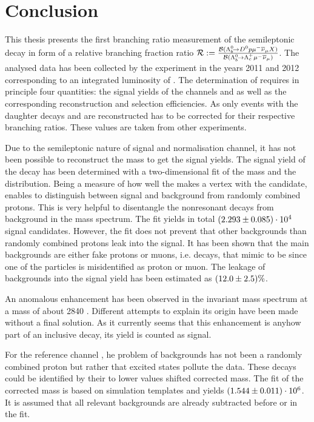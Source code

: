 \chapter{Conclusion}
\label{sec:Conclusion}
This thesis presents the first branching ratio measurement of the semileptonic decay \LbToDpmunuX in form of a relative branching fraction ratio $\mathcal{R} := \frac{{\cal B}({{\Lambda}^0_{b}}\!\rightarrow {\ensuremath{{D}^0}}{\ensuremath{p}}{\ensuremath{\mu^-}}{\ensuremath{{\overline{\nu}}_\mu}} X)}{{\cal B}({{\Lambda}^0_{b}}\!\rightarrow {\ensuremath{{\Lambda}^+_{c}}}{\ensuremath{\mu^-}}{\ensuremath{{\overline{\nu}}_\mu}})}$.
The analysed data has been collected by the \lhcb experiment in the years 2011 and 2012 corresponding to an integrated luminosity of \intlum{3\invfb}.
The determination of \R requires in principle four quantities: the signal yields of the channels \LbToDpmunuX and \LbToLcmunu as well as the corresponding reconstruction and selection efficiencies.
As only events with the daughter decays \DToKpi and \LcTopKpi are reconstructed \R has to be corrected for their respective branching ratios.
These values are taken from other experiments.

Due to the semileptonic nature of signal and normalisation channel, it has not been possible to reconstruct the \Lb mass to get the signal yields.
The signal yield of the decay \LbToDpmunuX has been determined with a two-dimensional fit of the \Dz\proton mass and the \logIP distribution.
Being a measure of how well the \proton makes a vertex with the \Dz\mun candidate, \logIP enables to distinguish between signal and background from randomly combined protons.
This is very helpful to disentangle the nonresonant \LbToDpmunuX decays from background in the \Dz\proton mass spectrum.
The fit yields in total $(2.293 \pm 0.085)\cdot 10^{4}$ signal candidates.
However, the fit does not prevent that other backgrounds than randomly combined protons leak into the signal.
It has been shown that the main backgrounds are either fake protons or muons, i.e. decays, that mimic to be \LbToDpmunuX since one of the particles is misidentified as proton or muon.
The leakage of backgrounds into the signal yield has been estimated as $(12.0 \pm 2.5)\%$.

An anomalous enhancement has been observed in the invariant \Dz\proton mass spectrum at a mass of about 2840 \mev.
Different attempts to explain its origin have been made without a final solution.
As it currently seems that this enhancement is anyhow part of an inclusive \LbToDpmunuX decay, its yield is counted as signal.

For the reference channel \LbToLcmunu, he problem of backgrounds has not been a randomly combined proton but rather that excited \Lcstar states pollute the data.
These decays could be identified by their to lower values shifted corrected \Lb mass.
The fit of the corrected mass is based on simulation templates and yields $(1.544 \pm 0.011)\cdot 10^{6}$.
It is assumed that all relevant backgrounds are already subtracted before or in the fit.


